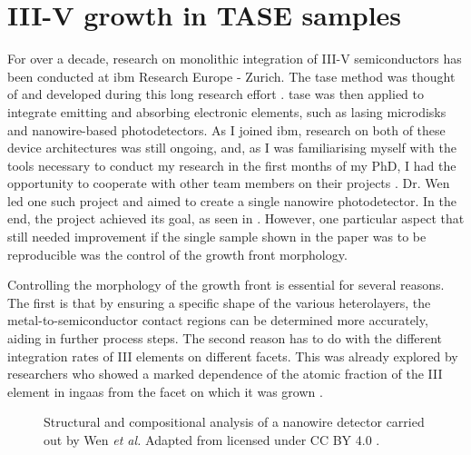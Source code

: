 \chapter{III-V growth in TASE samples}
\label{chap:growth}

For over a decade, research on monolithic integration of III-V semiconductors has been conducted at \acs{ibm} Research Europe - Zurich. The \acf{tase} method was thought of and developed during this long research effort \cite{borgTASEp2018, Mauthe2021}. \acs{tase} was then applied to integrate emitting and absorbing electronic elements, such as lasing microdisks and nanowire-based photodetectors. As I joined \acs{ibm}, research on both of these device architectures was still ongoing, and, as I was familiarising myself with the tools necessary to conduct my research in the first months of my PhD, I had the opportunity to cooperate with other team members on their projects \cite{Tiwari2021}. Dr. Wen led one such project and aimed to create a single nanowire photodetector. In the end, the project achieved its goal, as seen in \cite{Wen2022}. However, one particular aspect that still needed improvement if the single sample shown in the paper was to be reproducible was the control of the growth front morphology.

Controlling the morphology of the growth front is essential for several reasons. The first is that by ensuring a specific shape of the various heterolayers, the metal-to-semiconductor contact regions can be determined more accurately, aiding in further process steps. The second reason has to do with the different integration rates of III elements on different facets. This was already explored by researchers who showed a marked dependence of the atomic fraction of the III element in \acs{ingaas} from the facet on which it was grown \cite{Borg2019}.

\begin{figure}
    \centering
    \caption{Structural and compositional analysis of a nanowire detector carried out by Wen \textit{et al.} Adapted from \cite{Wen2022} licensed under CC BY 4.0 \cite{CCBY40}.}
    \label{fig:wen}
\end{figure}

